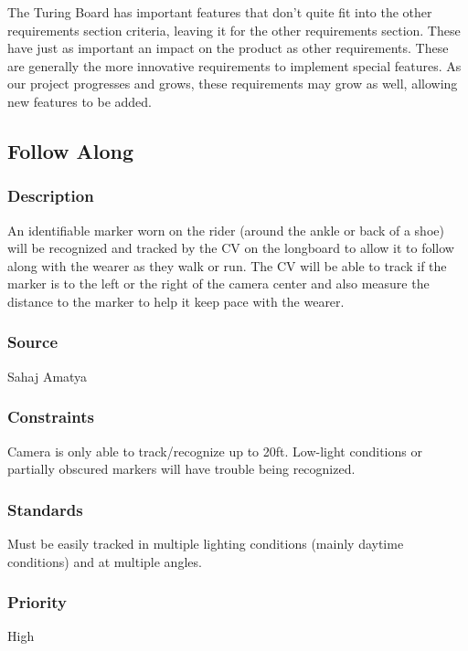The Turing Board has important features that don't quite fit into the other requirements section criteria, leaving it for the other requirements section. These have just as important an impact on the product as other requirements. These are generally the more innovative requirements to implement special features. As our project progresses and grows, these requirements may grow as well, allowing new features to be added.

\subsection{Follow Along}
\subsubsection{Description}
An identifiable marker worn on the rider (around the ankle or back of a shoe) will be recognized and tracked by the CV on the longboard to allow it to follow along with the wearer as they walk or run. The CV will be able to track if the marker is to the left or the right of the camera center and also measure the distance to the marker to help it keep pace with the wearer.
\subsubsection{Source}
Sahaj Amatya
\subsubsection{Constraints}
Camera is only able to track/recognize up to 20ft. Low-light conditions or partially obscured markers will have trouble being recognized.
\subsubsection{Standards}
Must be easily tracked in multiple lighting conditions (mainly daytime conditions) and at multiple angles.
\subsubsection{Priority}
High
